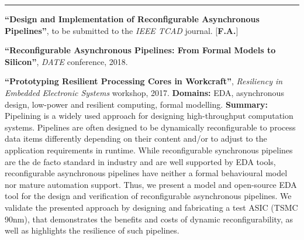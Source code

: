 \begin{cventries}
\vspace{-1mm}\rule{8cm}{0.5pt}\vspace{-3mm}
\cventry
{}
{}
{}
{}
{
\begin{cvitems}
\item{\textbf{``Design and Implementation of Reconfigurable Asynchronous 
Pipelines''}, to be submitted to the \textit{IEEE TCAD} journal. 
[\textbf{F.}\textbf{A.}]}
\item{\textbf{``Reconfigurable Asynchronous Pipelines: From Formal Models to 
Silicon''}, \textit{DATE} conference, 2018.\newline}
\item{\textbf{``Prototyping Resilient Processing Cores in Workcraft''}, 
\textit{Resiliency in Embedded Electronic Systems} workshop, 2017.\newline}
\textbf{Domains:} EDA, asynchronous design, low-power and resilient computing, 
formal modelling.\newline
\textbf{Summary:} Pipelining is a widely used approach for designing
high-throughput computation systems. Pipelines are often designed to be
dynamically reconfigurable to process data items differently depending on their
content and/or to adjust to the application requirements in runtime. While
reconfigurable synchronous pipelines are the de facto standard in industry and
are well supported by EDA tools, reconfigurable asynchronous pipelines have
neither a formal behavioural model nor mature automation support. Thus, we
present a model and open-source EDA tool for the design and verification of 
reconfigurable asynchronous pipelines. We validate the presented approach by
designing and fabricating a test ASIC (TSMC 90nm), that demonstrates the
benefits and costs of dynamic reconfigurability, as well as highlights the
resilience of such pipelines.
\end{cvitems}
}


\end{cventries}
